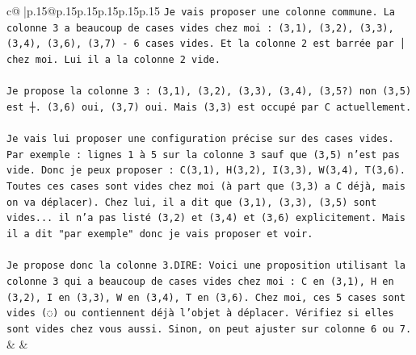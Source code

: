 \documentclass{article}
\begin{document}
{\begin{supertabular}{c@{$\;$}|p{.15\linewidth}@{}p{.15\linewidth}p{.15\linewidth}p{.15\linewidth}p{.15\linewidth}p{.15\linewidth}}
{{{\texttt{Je vais proposer une colonne commune. La colonne 3 a beaucoup de cases vides chez moi : (3,1), (3,2), (3,3), (3,4), (3,6), (3,7) {-} 6 cases vides. Et la colonne 2 est barrée par │ chez moi. Lui il a la colonne 2 vide. } \\
\\ 
\texttt{Je propose la colonne 3 : (3,1), (3,2), (3,3), (3,4), (3,5?) non (3,5) est ┼. (3,6) oui, (3,7) oui. Mais (3,3) est occupé par C actuellement. } \\
\\ 
\texttt{Je vais lui proposer une configuration précise sur des cases vides. Par exemple : lignes 1 à 5 sur la colonne 3 sauf que (3,5) n'est pas vide. Donc je peux proposer : C(3,1), H(3,2), I(3,3), W(3,4), T(3,6). Toutes ces cases sont vides chez moi (à part que (3,3) a C déjà, mais on va déplacer). Chez lui, il a dit que (3,1), (3,3), (3,5) sont vides... il n'a pas listé (3,2) et (3,4) et (3,6) explicitement. Mais il a dit "par exemple" donc je vais proposer et voir.} \\
\\ 
\texttt{Je propose donc la colonne 3.DIRE: Voici une proposition utilisant la colonne 3 qui a beaucoup de cases vides chez moi : C en (3,1), H en (3,2), I en (3,3), W en (3,4), T en (3,6). Chez moi, ces 5 cases sont vides (◌) ou contiennent déjà l'objet à déplacer. Vérifiez si elles sont vides chez vous aussi. Sinon, on peut ajuster sur colonne 6 ou 7.} \\
            }
        }
    }
    & & \\ \\


\end{supertabular}}
\end{document}
